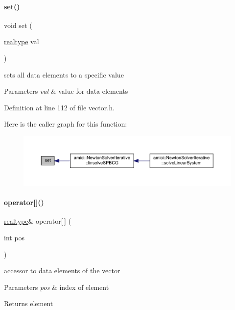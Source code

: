 \paragraph{\texorpdfstring{set()}{set()}}
{\footnotesize\ttfamily void set (\begin{DoxyParamCaption}\item[{\mbox{\hyperlink{namespaceamici_a1bdce28051d6a53868f7ccbf5f2c14a3}{realtype}}}]{val }\end{DoxyParamCaption})}

sets all data elements to a specific value 
\begin{DoxyParams}{Parameters}
{\em val} & value for data elements \\
\hline
\end{DoxyParams}


Definition at line 112 of file vector.\+h.

Here is the caller graph for this function\+:
\nopagebreak
\begin{figure}[H]
\begin{center}
\leavevmode
\includegraphics[width=350pt]{classamici_1_1_ami_vector_a11418c829db7c2891d63491cf12d29b4_icgraph}
\end{center}
\end{figure}
\mbox{\label{classamici_1_1_ami_vector_a3cea12a1bf8945da7c2d39b9ee526ed2}} 
\paragraph{\texorpdfstring{operator[]()}{operator[]()}}
{\footnotesize\ttfamily \mbox{\hyperlink{namespaceamici_a1bdce28051d6a53868f7ccbf5f2c14a3}{realtype}}\& operator\mbox{[}$\,$\mbox{]} (\begin{DoxyParamCaption}\item[{int}]{pos }\end{DoxyParamCaption})}

accessor to data elements of the vector 
\begin{DoxyParams}{Parameters}
{\em pos} & index of element \\
\hline
\end{DoxyParams}
\begin{DoxyReturn}{Returns}
element 
\end{DoxyReturn}


